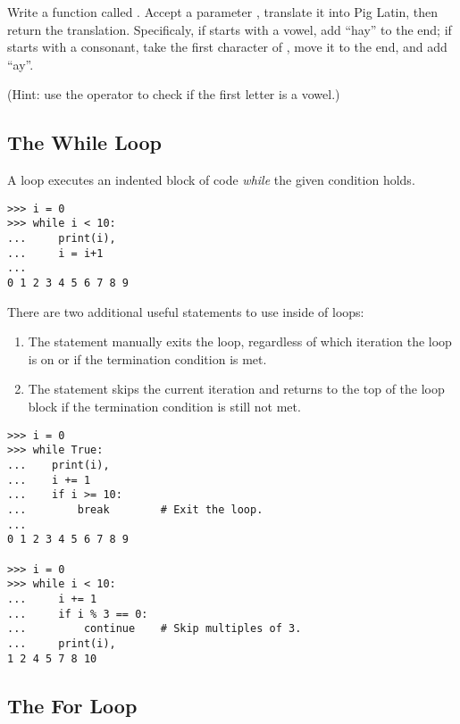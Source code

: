 \begin{problem} %
Write a function called .
Accept a parameter , translate it into Pig Latin, then return the translation.
Specificaly, if  starts with a vowel, add ``hay'' to the end; if  starts with a consonant, take the first character of , move it to the end, and add ``ay''.

(Hint: use the  operator to check if the first letter is a vowel.)
\end{problem}

\subsection*{The While Loop} %

A  loop executes an indented block of code \emph{while} the given condition holds. 

\begin{lstlisting}
>>> i = 0
>>> while i < 10:        
...     print(i),            
...     i = i+1
...     
0 1 2 3 4 5 6 7 8 9
\end{lstlisting}

There are two additional useful statements to use inside of loops:
\begin{enumerate}
\item The  statement manually exits the loop, regardless of which iteration the loop is on or if the termination condition is met.
\item The  statement skips the current iteration and returns to the top of the loop block if the termination condition is still not met.
\end{enumerate}

\begin{lstlisting}
>>> i = 0
>>> while True:
...    print(i),
...    i += 1
...    if i >= 10:
...        break        # Exit the loop.
...
0 1 2 3 4 5 6 7 8 9

>>> i = 0
>>> while i < 10:
...     i += 1
...     if i % 3 == 0:
...         continue    # Skip multiples of 3.
...     print(i),
1 2 4 5 7 8 10
\end{lstlisting}

\subsection*{The For Loop} %

